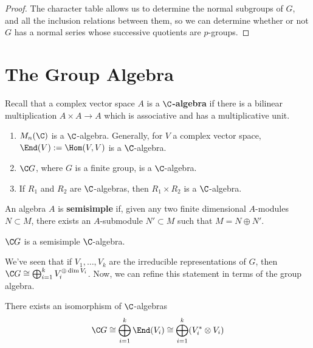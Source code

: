 \begin{proof}
    The character table allows us to determine the normal subgroups of $G$, and all the inclusion relations between them, so we can determine whether or not $G$ has a normal series whose successive quotients are $p$-groups.
\end{proof}

\section{The Group Algebra}

\begin{defn}
    Recall that a complex vector space $A$ is a \textbf{$\C$-algebra} if there is a bilinear multiplication $A \times A \to A$ which is associative and has a multiplicative unit.
\end{defn}

\begin{ex}
    \begin{enumerate}
        \item $M_n(\C)$ is a $\C$-algebra. Generally, for $V$ a complex vector space, $\End(V):=\Hom(V,V)$ is a $\C$-algebra.
        \item $\C G$, where $G$ is a finite group, is a $\C$-algebra.
        \item If $R_1$ and $R_2$ are $\C$-algebras, then $R_1 \times R_2$ is a $\C$-algebra.
    \end{enumerate}
\end{ex}

\begin{defn}
    An algebra $A$ is \textbf{semisimple} if, given any two finite dimensional $A$-modules $N \subset M$, there exists an $A$-submodule $N' \subset M$ such that $M=N \oplus N'$.
\end{defn}

\begin{ex}
    $\C G$ is a semisimple $\C$-algebra.
\end{ex}

 We've seen that if $V_1,\dots,V_k$ are the irreducible representations of $G$, then $\C G\cong \bigoplus_{i=1}^kV_i^{\oplus \dim V_i}$. Now, we can refine this statement in terms of the group algebra.

\begin{thm}
    There exists an isomorphism of $\C$-algebras
    $$\C G \cong \bigoplus _{i=1}^k\End(V_i)\cong \bigoplus _{i=1}^k(V_i^*\otimes V_i)$$
\end{thm}

